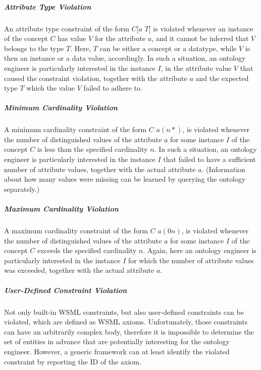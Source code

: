 \subparagraph{Attribute Type Violation} An attribute type
constraint of the form $C[a$  $T]$ is violated whenever an instance of the concept $C$ has value $V$ for
the attribute $a$, and it cannot be inferred that $V$ belongs to the type $T$. Here, $T$ can be either a concept or a datatype, while $V$ is then an instance or a data value,
accordingly. In such a situation, an ontology engineer is particularly
interested in the instance $I$, in the attribute value $V$ that caused the
constraint violation, together with the attribute $a$ and the
expected type $T$ which the value $V$ failed to adhere to.

\subparagraph{Minimum Cardinality Violation} A minimum
cardinality constraint of the
form  $C$ $a (n *)$, is violated whenever the number of distinguished values of the attribute $a$ for
some instance $I$ of the concept $C$ is less than the specified
cardinality $n$. In such a situation, an ontology engineer is
particularly interested in the instance $I$ that failed to have a
sufficient number of attribute values, together with the actual
attribute $a$. (Information about how many values were missing can
be learned by querying the ontology separately.)

\subparagraph{Maximum Cardinality Violation} A maximum
cardinality constraint of the
form  $C$ $a (0 n)$, is violated whenever the number of distinguished values of the attribute $a$ for
some instance $I$ of the concept $C$ exceeds the specified
cardinality $n$. Again, here an ontology engineer is particularly
interested in the instance $I$ for which the number of attribute
values was exceeded, together with the actual attribute $a$.

\subparagraph{User-Defined Constraint Violation} Not only built-in WSML constraints, but also user-defined constraints can be violated, which are defined as WSML axioms. Unfortunately, those constraints can have an arbitrarily complex body, therefore it is impossible to determine the set of entities in advance that are potentially interesting for the ontology engineer. However,
a generic framework can at least identify the violated constraint
by reporting the ID of the axiom.

